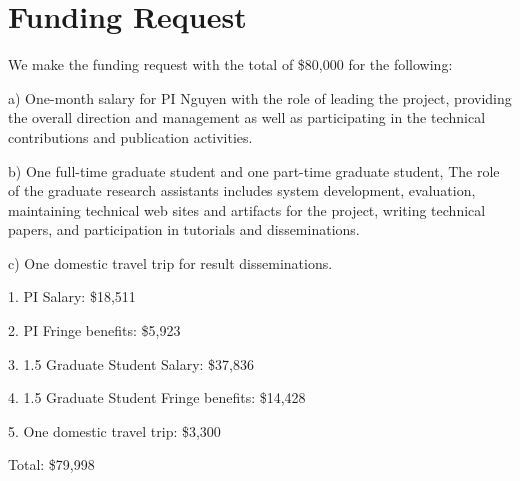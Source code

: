 \section{Funding Request}

We make the funding request with the total of \$80,000 for the following:

a) One-month salary for PI Nguyen with the role of leading the
project, providing the overall direction and management
as well as participating in the technical contributions and
publication activities.

b) One full-time graduate student and one part-time graduate student,
The role of the graduate research assistants includes system
development, evaluation, maintaining technical web sites and artifacts
for the project, writing technical papers, and participation in
tutorials and disseminations.

c) One domestic travel trip for result disseminations.

1. PI Salary: \$18,511

2. PI Fringe benefits: \$5,923

3. 1.5 Graduate Student Salary: \$37,836

4. 1.5 Graduate Student Fringe benefits: \$14,428

5. One domestic travel trip: \$3,300

Total: \$79,998


